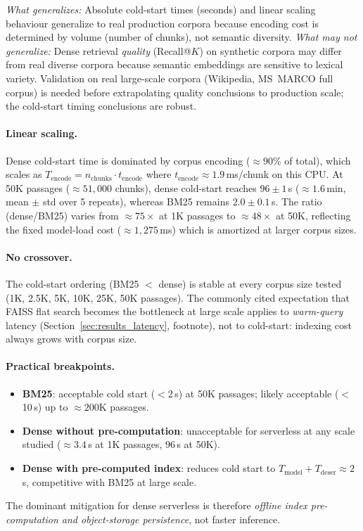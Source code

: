 \documentclass[11pt,a4paper]{article}
\begin{document}
\smallskip\noindent
\textit{What generalizes:}
Absolute cold-start times (seconds) and linear scaling behaviour
generalize to real production corpora because encoding cost is
determined by volume (number of chunks), not semantic diversity.
\textit{What may not generalize:}
Dense retrieval \emph{quality} (Recall@$K$) on synthetic corpora may
differ from real diverse corpora because semantic embeddings are
sensitive to lexical variety.
Validation on real large-scale corpora (Wikipedia, MS~MARCO full corpus)
is needed before extrapolating quality conclusions to production scale;
the cold-start timing conclusions are robust.

\paragraph{Linear scaling.}
Dense cold-start time is dominated by corpus encoding
($\approx\!90\%$ of total), which scales as
$T_{\mathrm{encode}} = n_{\mathrm{chunks}} \cdot t_{\mathrm{encode}}$
where $t_{\mathrm{encode}} \approx 1.9$\,ms/chunk on this CPU.
At 50K passages ($\approx\!51{,}000$ chunks), dense cold-start reaches
$96 \pm 1$\,s ($\approx\!1.6$\,min, mean $\pm$ std over 5 repeats),
whereas BM25 remains $2.0 \pm 0.1$\,s.
The ratio (dense/BM25) varies from $\approx\!75\times$ at 1K passages to
$\approx\!48\times$ at 50K, reflecting the fixed model-load cost
($\approx\!1{,}275$\,ms) which is amortized at larger corpus sizes.

\paragraph{No crossover.}
The cold-start ordering (BM25 $<$ dense) is stable at every corpus size
tested (1K, 2.5K, 5K, 10K, 25K, 50K passages).
The commonly cited expectation that FAISS flat search becomes the bottleneck
at large scale applies to \emph{warm-query} latency
(Section~\ref{sec:results_latency}, footnote),
not to cold-start: indexing cost always grows with corpus size.

\paragraph{Practical breakpoints.}
\begin{itemize}[leftmargin=*,topsep=2pt,itemsep=1pt]
  \item \textbf{BM25}: acceptable cold start ($<$2\,s) at 50K passages;
        likely acceptable ($<$10\,s) up to $\approx\!200$K passages.
  \item \textbf{Dense without pre-computation}: unacceptable for serverless
        at any scale studied ($\approx\!3.4$\,s at 1K passages, 96\,s at 50K).
  \item \textbf{Dense with pre-computed index}: reduces cold start to
        $T_{\mathrm{model}} + T_{\mathrm{deser}} \approx 2$\,s,
        competitive with BM25 at large scale.
\end{itemize}
The dominant mitigation for dense serverless is therefore \emph{offline
index pre-computation and object-storage persistence}, not faster inference.
\end{document}

